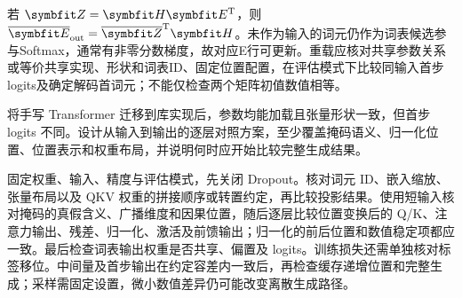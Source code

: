 \begin{exercises}
\begin{exercise}
\begin{solution}
若 $\mat{Z}=\mat{H}\mat{E}^{\mathrm{T}}$，则 $\overline{\mat{E}}_{\mathrm{out}}=\overline{\mat{Z}}^{\mathrm{T}}\mat{H}$。未作为输入的词元仍作为词表候选参与Softmax，通常有非零分数梯度，故对应E行可更新。重载应核对共享参数关系或等价共享实现、形状和词表ID、固定位置配置，在评估模式下比较同输入首步logits及确定解码首词元；不能仅检查两个矩阵初值数值相等。
\end{solution}
\end{exercise}

\begin{exercise} 将手写 Transformer 迁移到库实现后，参数均能加载且张量形状一致，但首步 logits 不同。设计从输入到输出的逐层对照方案，至少覆盖掩码语义、归一化位置、位置表示和权重布局，并说明何时应开始比较完整生成结果。

\begin{solution}
固定权重、输入、精度与评估模式，先关闭 Dropout。核对词元 ID、嵌入缩放、张量布局以及 QKV 权重的拼接顺序或转置约定，再比较投影结果。使用短输入核对掩码的真假含义、广播维度和因果位置，随后逐层比较位置变换后的 Q/K、注意力输出、残差、归一化、激活及前馈输出；归一化的前后位置和数值稳定项都应一致。最后检查词表输出权重是否共享、偏置及 logits。训练损失还需单独核对标签移位。中间量及首步输出在约定容差内一致后，再检查缓存递增位置和完整生成；采样需固定设置，微小数值差异仍可能改变离散生成路径。
\end{solution}
\end{exercise}

\end{exercises}
